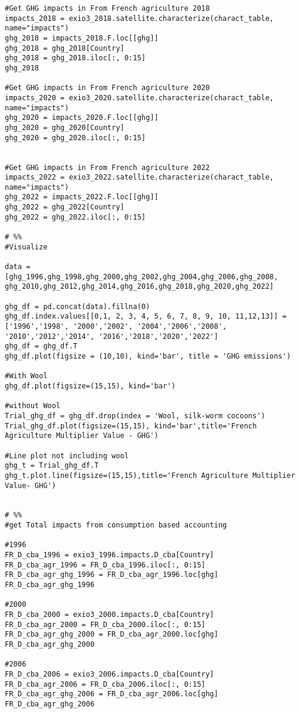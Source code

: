 \documentclass[a4paper,twoside]{article}
\begin{document}
\begin{verbatim}
#Get GHG impacts in From French agriculture 2018
impacts_2018 = exio3_2018.satellite.characterize(charact_table, name="impacts")
ghg_2018 = impacts_2018.F.loc[[ghg]]
ghg_2018 = ghg_2018[Country]
ghg_2018 = ghg_2018.iloc[:, 0:15]
ghg_2018

#Get GHG impacts in From French agriculture 2020
impacts_2020 = exio3_2020.satellite.characterize(charact_table, name="impacts")
ghg_2020 = impacts_2020.F.loc[[ghg]]
ghg_2020 = ghg_2020[Country]
ghg_2020 = ghg_2020.iloc[:, 0:15]


#Get GHG impacts in From French agriculture 2022
impacts_2022 = exio3_2022.satellite.characterize(charact_table, name="impacts")
ghg_2022 = impacts_2022.F.loc[[ghg]]
ghg_2022 = ghg_2022[Country]
ghg_2022 = ghg_2022.iloc[:, 0:15]

# %%
#Visualize

data = [ghg_1996,ghg_1998,ghg_2000,ghg_2002,ghg_2004,ghg_2006,ghg_2008, ghg_2010,ghg_2012,ghg_2014,ghg_2016,ghg_2018,ghg_2020,ghg_2022]

ghg_df = pd.concat(data).fillna(0)
ghg_df.index.values[[0,1, 2, 3, 4, 5, 6, 7, 8, 9, 10, 11,12,13]] = ['1996','1998', '2000','2002', '2004','2006','2008', '2010','2012','2014', '2016','2018','2020','2022']
ghg_df = ghg_df.T
ghg_df.plot(figsize = (10,10), kind='bar', title = 'GHG emissions')

#With Wool
ghg_df.plot(figsize=(15,15), kind='bar')

#without Wool
Trial_ghg_df = ghg_df.drop(index = 'Wool, silk-worm cocoons')
Trial_ghg_df.plot(figsize=(15,15), kind='bar',title='French Agriculture Multiplier Value - GHG')

#Line plot not including wool
ghg_t = Trial_ghg_df.T
ghg_t.plot.line(figsize=(15,15),title='French Agriculture Multiplier Value- GHG')


# %%
#get Total impacts from consumption based accounting

#1996
FR_D_cba_1996 = exio3_1996.impacts.D_cba[Country]
FR_D_cba_agr_1996 = FR_D_cba_1996.iloc[:, 0:15]
FR_D_cba_agr_ghg_1996 = FR_D_cba_agr_1996.loc[ghg]
FR_D_cba_agr_ghg_1996

#2000
FR_D_cba_2000 = exio3_2000.impacts.D_cba[Country]
FR_D_cba_agr_2000 = FR_D_cba_2000.iloc[:, 0:15]
FR_D_cba_agr_ghg_2000 = FR_D_cba_agr_2000.loc[ghg]
FR_D_cba_agr_ghg_2000

#2006
FR_D_cba_2006 = exio3_2006.impacts.D_cba[Country]
FR_D_cba_agr_2006 = FR_D_cba_2006.iloc[:, 0:15]
FR_D_cba_agr_ghg_2006 = FR_D_cba_agr_2006.loc[ghg]
FR_D_cba_agr_ghg_2006


\end{verbatim}
\end{document}
